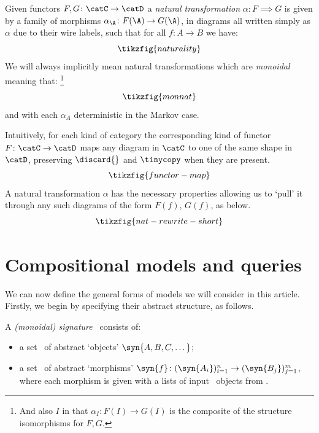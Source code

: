 \documentclass{article}
\begin{document}
Given functors $F, G \colon \catC \to \catD$ a \emph{natural transformation} 
$\alpha \colon F \implies G$ is given by a family of morphisms $\alpha_\A \colon F(\A) \to G(\A)$, in diagrams all written simply as $\alpha$ due to their wire labels, such that for all $f \colon A \to B$ we have: 
\begin{equation} \label{eq:naturality}
\tikzfig{naturality}
\end{equation}
We will always implicitly mean natural transformations which are \emph{monoidal} meaning that:
\footnote{And also $I$ in that $\alpha_I \colon F(I) \to G(I)$ is the composite of the structure isomorphisms for $F, G$.}
\[
\tikzfig{monnat} 
\]
and with each $\alpha_A$ deterministic in the Markov case. %


\begin{remark}
Intuitively, for each kind of category the corresponding kind of functor $F \colon \catC \to \catD$ maps any diagram in $\catC$ to one of the same shape in $\catD$, preserving $\discard{}$ and $\tinycopy$ when they are present.
\[
\tikzfig{functor-map}
\]
A natural transformation $\alpha$ has the necessary properties allowing us to  `pull' it through any such diagrams of the form $F(f)$, $G(f)$, as below. 
\[
\tikzfig{nat-rewrite-short}
\]
\end{remark}


\section{Compositional models and queries} \label{sec:comp-models}

We can now define the general forms of models we will consider in this article. Firstly, we begin by specifying their abstract structure, as follows.


\begin{definition}[Signature]
A \emph{(monoidal) signature} \rl{$\Gensig$}\ consists of:
\begin{itemize}
\item 
a set \rl{$\Gensigob$}\ of abstract `objects' $\syn{A,B,C,\dots}$;
\item 
a set \rl{$\Gensigmor$}\ of abstract `morphisms' $\syn{f} \colon (\syn{A_i})^n_{i=1} \to (\syn{B_j})^m_{j=1}$, where each morphism is given with a lists of input \ objects from \rlc{$\Gensigob$}. 
\end{itemize}
\end{definition} 
\end{document}
